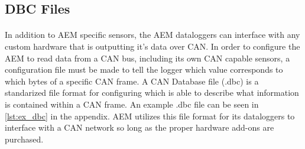 \subsection{DBC Files}

\paragraph{}
In addition to AEM specific sensors, the AEM dataloggers can interface with any custom hardware that is outputting it's data over CAN.
In order to configure the AEM to read data from a CAN bus, including its own CAN capable sensors, a configuration file must be made to tell the logger which value corresponds to which bytes of a specific CAN frame.
A CAN Database file (.dbc) is a standarized file format for configuring which is able to describe what information is contained within a CAN frame.
An example .dbc file can be seen in \cref{lst:ex_dbc} in the appendix.
AEM utilizes this file format for its dataloggers to interface with a CAN network so long as the proper hardware add-ons are purchased.